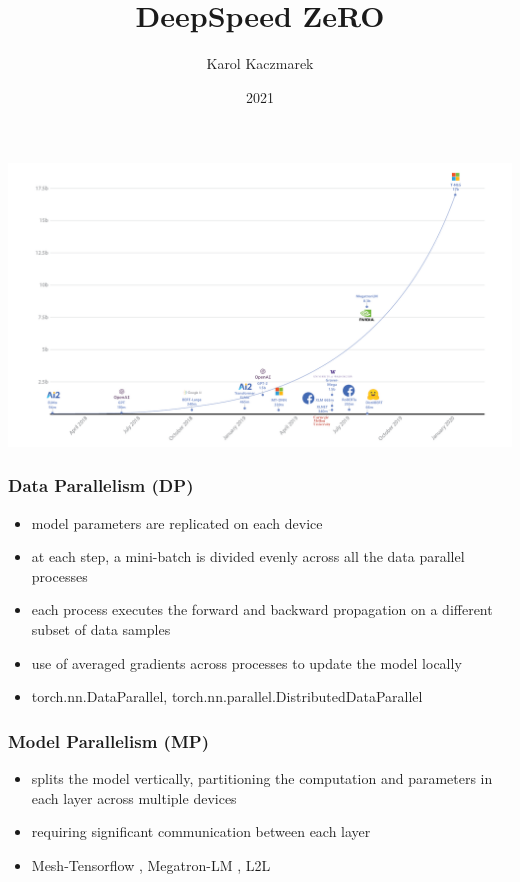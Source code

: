 \documentclass{beamer}
\title{DeepSpeed ZeRO}
\date{2021}
\author{Karol Kaczmarek}
\begin{document}
\begin{frame}
    \titlepage
\end{frame}

\begin{frame}
    \includegraphics[scale=0.25]{img/TurningNGL.png}
\end{frame}

\begin{frame}
    \frametitle{Data Parallelism (DP)}
    \begin{itemize}
        \item model parameters are replicated on each device
        \item at each step, a mini-batch is divided evenly across all the data parallel processes
        \item each process executes the forward and backward propagation on a different subset of data samples
        \item use of averaged gradients across processes to update the model locally
        \item torch.nn.DataParallel, torch.nn.parallel.DistributedDataParallel
    \end{itemize}
\end{frame}

\begin{frame}
    \frametitle{Model Parallelism (MP)}
    \begin{itemize}
        \item splits the model vertically, partitioning the computation and parameters in each layer across multiple devices
        \item requiring significant communication between each layer
        \item Mesh-Tensorflow \cite{mesh_tensorflow}, Megatron-LM \cite{megatronlm} \cite{megatronlm_2}, L2L \cite{l2l}
    \end{itemize}
\end{frame}
\end{document}
